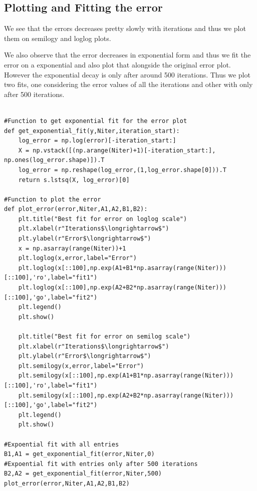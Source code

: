 \documentclass[11pt, a4paper]{article}
\begin{document}
\clearpage
\subsection{Plotting and Fitting the error}
We see that the errors decreases pretty slowly with iterations and thus we plot them on semilogy and loglog plots.

We also observe that the error decreases in exponential form and thus we fit the error on a exponential and also plot that alongside the original error plot. However the exponential decay is only after around 500 iterations. Thus we plot two fits, one considering the error values of all the iterations and other with only after 500 iterations.
\begin{lstlisting}

#Function to get exponential fit for the error plot
def get_exponential_fit(y,Niter,iteration_start):
    log_error = np.log(error)[-iteration_start:]
    X = np.vstack([(np.arange(Niter)+1)[-iteration_start:], np.ones(log_error.shape)]).T
    log_error = np.reshape(log_error,(1,log_error.shape[0])).T
    return s.lstsq(X, log_error)[0]

#Function to plot the error
def plot_error(error,Niter,A1,A2,B1,B2):
    plt.title("Best fit for error on loglog scale")
    plt.xlabel(r"Iterations$\longrightarrow$")
    plt.ylabel(r"Error$\longrightarrow$")
    x = np.asarray(range(Niter))+1
    plt.loglog(x,error,label="Error")
    plt.loglog(x[::100],np.exp(A1+B1*np.asarray(range(Niter)))[::100],'ro',label="fit1")
    plt.loglog(x[::100],np.exp(A2+B2*np.asarray(range(Niter)))[::100],'go',label="fit2")
    plt.legend()
    plt.show()
    
    plt.title("Best fit for error on semilog scale")
    plt.xlabel(r"Iterations$\longrightarrow$")
    plt.ylabel(r"Error$\longrightarrow$")
    plt.semilogy(x,error,label="Error")
    plt.semilogy(x[::100],np.exp(A1+B1*np.asarray(range(Niter)))[::100],'ro',label="fit1")
    plt.semilogy(x[::100],np.exp(A2+B2*np.asarray(range(Niter)))[::100],'go',label="fit2")
    plt.legend()
    plt.show()

#Expoential fit with all entries
B1,A1 = get_exponential_fit(error,Niter,0)
#Expoential fit with entries only after 500 iterations
B2,A2 = get_exponential_fit(error,Niter,500)
plot_error(error,Niter,A1,A2,B1,B2)
\end{lstlisting}
\end{document}
